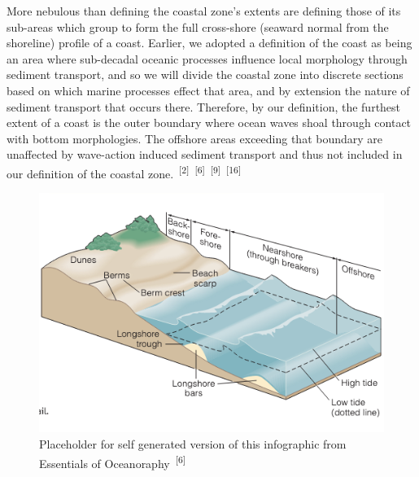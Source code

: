 \documentclass{article}
\begin{document}
\par{\hspace{.5cm}More nebulous than defining the coastal zone's extents are defining those of its sub-areas which group to form the full cross-shore (seaward normal from the shoreline) profile of a coast. Earlier, we adopted a definition of the coast as being an area where sub-decadal oceanic processes influence local morphology through sediment transport, and so we will divide the coastal zone into discrete sections based on which marine processes effect that area, and by extension the nature of sediment transport that occurs there. Therefore, by our definition, the furthest extent of a coast is the outer boundary where ocean waves shoal through contact with bottom morphologies. The offshore areas exceeding that boundary are unaffected by wave-action induced sediment transport and thus not included in our definition of the coastal zone.~\textsuperscript{[2]}~\textsuperscript{[6]}~\textsuperscript{[9]}~\textsuperscript{[16]}}

\begin{figure}
    \centering
    \includegraphics[width=1.0\linewidth]{images/coastal-sub-zones.png}
    \caption{Placeholder for self generated version of this infographic from Essentials of Oceanoraphy~\textsuperscript{[6]}}
    \label{figure5}
\end{figure}
\end{document}
